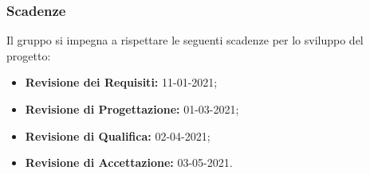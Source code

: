 \subsubsection{Scadenze}
Il gruppo \Gruppo{} si impegna a rispettare le seguenti scadenze per lo sviluppo del progetto:
\begin{itemize}
\item \textbf{Revisione dei Requisiti:} 11-01-2021;
\item \textbf{Revisione di Progettazione:} 01-03-2021;
\item \textbf{Revisione di Qualifica:} 02-04-2021;
\item \textbf{Revisione di Accettazione:} 03-05-2021.
\end{itemize}

